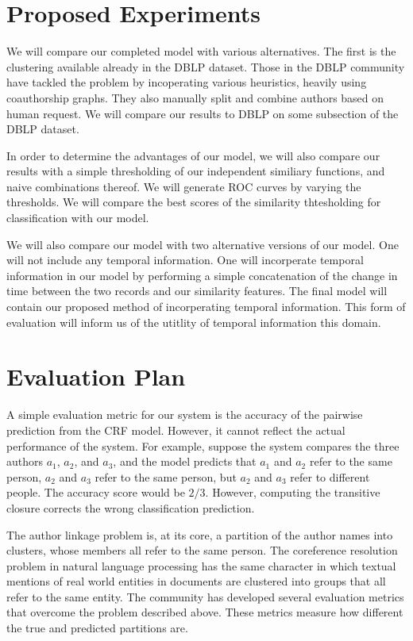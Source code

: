 \documentclass[twocolumn,letterpaper]{article}
\begin{document}
\section{Proposed Experiments} %
\label{sec:proposed_experiments}
We will compare our completed model with various alternatives. The first is the clustering available already in the DBLP dataset. Those in the DBLP community have tackled the problem by incoperating various heuristics, heavily using coauthorship graphs. They also manually split and combine authors based on human request. We will compare our results to DBLP on some subsection of the DBLP dataset. 

In order to determine the advantages of our model, we will also compare our results with a simple thresholding of our independent similiary functions, and naive combinations thereof. We will generate ROC curves by varying the thresholds. We will compare the best scores of the similarity thtesholding for classification with our model.

We will also compare our model with two alternative versions of our model. One will not include any temporal information. One will incorperate temporal information in our model by performing a simple concatenation of the change in time between the two records and our similarity features. The final model will contain our proposed method of incorperating temporal information. This form of evaluation will inform us of the utitlity of temporal information this domain.

\section{Evaluation Plan} %
\label{sec:evaluation}
A simple evaluation metric for our system is the accuracy
of the pairwise prediction from the CRF model.  However, it cannot
reflect the actual performance of the system.  For example, suppose
the system compares the three authors $a_1$, $a_2$, and $a_3$, and the
model predicts that $a_1$ and $a_2$ refer to the same person, $a_2$
and $a_3$ refer to the same person, but $a_2$ and $a_3$ refer to
different people.  The accuracy score would be $2/3$.  However,
computing the transitive closure corrects the wrong classification
prediction.

The author linkage problem is, at its core, a partition of the author
names into clusters, whose members all refer to the same person.  The
coreference resolution problem in natural language processing has the
same character in which textual mentions of real world entities in
documents are clustered into groups that all refer to the same entity.
The community has developed several evaluation metrics that overcome
the problem described above.  These metrics measure how different the
true and predicted partitions are.
\end{document}
